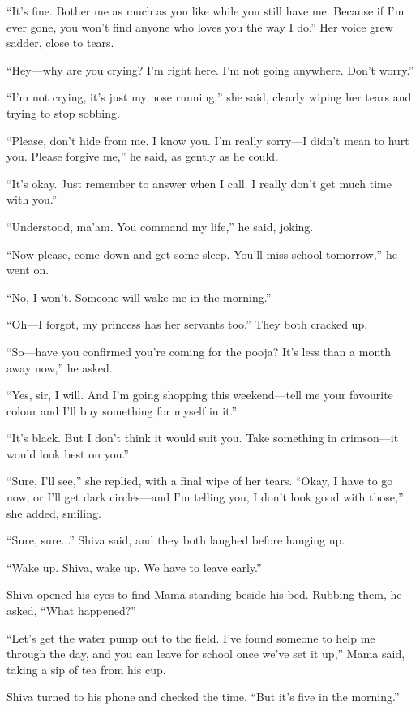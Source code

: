 ``It's fine. Bother me as much as you like while you still have me. Because if I'm ever gone, you won't find anyone who loves you the way I do.'' Her voice grew sadder, close to tears.

``Hey—why are you crying? I'm right here. I'm not going anywhere. Don't worry.''

``I'm not crying, it's just my nose running,'' she said, clearly wiping her tears and trying to stop sobbing.

``Please, don't hide from me. I know you. I'm really sorry—I didn't mean to hurt you. Please forgive me,'' he said, as gently as he could.

``It's okay. Just remember to answer when I call. I really don't get much time with you.''

``Understood, ma'am. You command my life,'' he said, joking.

``Now please, come down and get some sleep. You'll miss school tomorrow,'' he went on.

``No, I won't. Someone will wake me in the morning.''

``Oh—I forgot, my princess has her servants too.'' They both cracked up.

``So—have you confirmed you're coming for the pooja? It's less than a month away now,'' he asked.

``Yes, sir, I will. And I'm going shopping this weekend—tell me your favourite colour and I'll buy something for myself in it.''

``It's black. But I don't think it would suit you. Take something in crimson—it would look best on you.''

``Sure, I'll see,'' she replied, with a final wipe of her tears. ``Okay, I have to go now, or I'll get dark circles—and I'm telling you, I don't look good with those,'' she added, smiling.

``Sure, sure...'' Shiva said, and they both laughed before hanging up.

``Wake up. Shiva, wake up. We have to leave early.''

Shiva opened his eyes to find Mama standing beside his bed. Rubbing them, he asked, ``What happened?''

``Let's get the water pump out to the field. I've found someone to help me through the day, and you can leave for school once we've set it up,'' Mama said, taking a sip of tea from his cup.

Shiva turned to his phone and checked the time. ``But it's five in the morning.''

